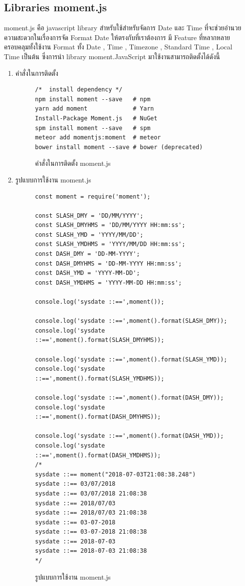 \subsection{Libraries moment.js}
moment.js คือ javascript library สำหรับใช้สำหรับจัดการ Date และ Time ที่จะช่วยอำนวยความสะดวกในเรื่องการจัด Format Date ให้ตรงกับที่เราต้องการ
มี Feature ที่หลากหลายครอบคลุมทั้งใช้งาน Format ทั้ง Date , Time , Timezone , Standard Time , Local Time เป็นต้น ซึ่งการนำ library moment.JavaScript 
มาใช้งานสามารถติดตั้งได้ดังนี้
\begin{enumerate}
\item คำสั่งในการติดตั้ง
	\begin{figure}[H]
		{\begin{lstlisting}
/*  install dependency */
npm install moment --save   # npm
yarn add moment             # Yarn
Install-Package Moment.js   # NuGet
spm install moment --save   # spm
meteor add momentjs:moment  # meteor
bower install moment --save # bower (deprecated)
		\end{lstlisting}}
	\centering
		\caption{คำสั่งในการติดตั้ง moment.js}
		\label{Fig:momentjs}
	\end{figure}

\item รูปแบบการใช้งาน moment.js
	\begin{figure}[H]
		{\begin{lstlisting}
const moment = require('moment');

const SLASH_DMY = 'DD/MM/YYYY';
const SLASH_DMYHMS = 'DD/MM/YYYY HH:mm:ss';
const SLASH_YMD = 'YYYY/MM/DD';
const SLASH_YMDHMS = 'YYYY/MM/DD HH:mm:ss';
const DASH_DMY = 'DD-MM-YYYY';
const DASH_DMYHMS = 'DD-MM-YYYY HH:mm:ss';
const DASH_YMD = 'YYYY-MM-DD';
const DASH_YMDHMS = 'YYYY-MM-DD HH:mm:ss';
			
console.log('sysdate ::==',moment());
			
console.log('sysdate ::==',moment().format(SLASH_DMY));
console.log('sysdate ::==',moment().format(SLASH_DMYHMS));
			
console.log('sysdate ::==',moment().format(SLASH_YMD));
console.log('sysdate ::==',moment().format(SLASH_YMDHMS));
			
console.log('sysdate ::==',moment().format(DASH_DMY));
console.log('sysdate ::==',moment().format(DASH_DMYHMS));
			
console.log('sysdate ::==',moment().format(DASH_YMD));
console.log('sysdate ::==',moment().format(DASH_YMDHMS));
/*
sysdate ::== moment("2018-07-03T21:08:38.248")
sysdate ::== 03/07/2018
sysdate ::== 03/07/2018 21:08:38
sysdate ::== 2018/07/03
sysdate ::== 2018/07/03 21:08:38
sysdate ::== 03-07-2018
sysdate ::== 03-07-2018 21:08:38
sysdate ::== 2018-07-03
sysdate ::== 2018-07-03 21:08:38
*/
		\end{lstlisting}}
	\centering
		\caption{รูปแบบการใช้งาน moment.js}
		\label{Fig:howtomomentjs}
	\end{figure}


\end{enumerate}
